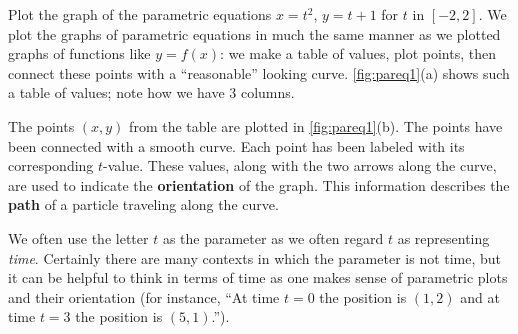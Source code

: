\begin{example}\label{ex_pareq1}%
Plot the graph of the parametric equations $x=t^2$, $y=t+1$ for $t$ in $[-2,2]$.
\solution
We plot the graphs of parametric equations in much the same manner as we plotted graphs of functions like $y=f(x)$: we make a table of values, plot points, then connect these points with a ``reasonable'' looking curve. \autoref{fig:pareq1}(a) shows such a table of values; note how we have 3 columns.

The points $(x,y)$ from the table are plotted in \autoref{fig:pareq1}(b). The points have been connected with a smooth curve. Each point has been labeled with its corresponding $t$-value. These values, along with the two arrows along the curve, are used to indicate the \textbf{orientation} of the graph. This information describes the \textbf{path} of a particle traveling along the curve.
\end{example}

We often use the letter $t$ as the parameter as we often regard $t$ as representing \emph{time}. Certainly there are many contexts in which the parameter is not time, but it can be helpful to think in terms of time as one makes sense of parametric plots and their orientation (for instance, ``At time $t=0$ the position is $(1,2)$ and at time $t=3$ the position is $(5,1)$.'').

